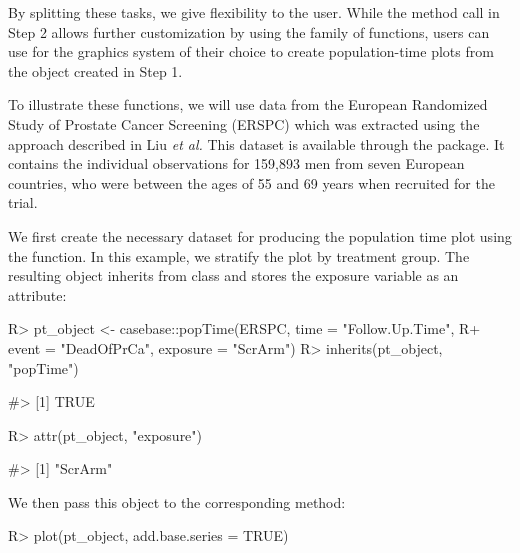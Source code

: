 \documentclass[
]{jss}
\begin{document}
By splitting these tasks, we give flexibility to the user. While the
method call in Step 2 allows further customization by using the
 \citep{ggplot2} family of functions, users can use for the
graphics system of their choice to create population-time plots from the
object created in Step 1.

To illustrate these functions, we will use data from the European
Randomized Study of Prostate Cancer Screening (ERSPC)
\citep{schroder2009screening} which was extracted using the approach
described in Liu \emph{et al.} \citeyearpar{liu2014recovering} This
dataset is available through the  package. It contains the
individual observations for 159,893 men from seven European countries,
who were between the ages of 55 and 69 years when recruited for the
trial.

We first create the necessary dataset for producing the population time
plot using the  function. In this example, we stratify the
plot by treatment group. The resulting object inherits from class
 and stores the exposure variable as an attribute:

\begin{CodeChunk}

\begin{CodeInput}
R> pt_object <- casebase::popTime(ERSPC, time = "Follow.Up.Time",
R+                                event = "DeadOfPrCa", exposure = "ScrArm")
R> inherits(pt_object, "popTime")
\end{CodeInput}

\begin{CodeOutput}
#> [1] TRUE
\end{CodeOutput}

\begin{CodeInput}
R> attr(pt_object, "exposure")
\end{CodeInput}

\begin{CodeOutput}
#> [1] "ScrArm"
\end{CodeOutput}
\end{CodeChunk}

We then pass this object to the corresponding  method:

\begin{CodeChunk}

\begin{CodeInput}
R> plot(pt_object, add.base.series = TRUE)
\end{CodeInput}
\end{CodeChunk}
\end{document}
